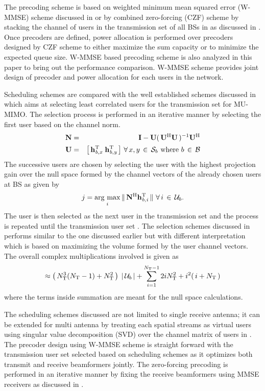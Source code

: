 The precoding scheme is based on weighted minimum mean squared error (W-MMSE) scheme discussed in \cite{wmmse_shi} or by combined zero-forcing (CZF) scheme by stacking the channel of users in the transmission set of all BSs in  as discussed in \cite{spencer2004zero}. Once precoders are defined, power allocation is performed over precoders designed by CZF scheme to either maximize the sum capacity or to minimize the expected queue size. W-MMSE based precoding scheme is also analyzed in this paper to bring out the performance comparison. W-MMSE scheme provides joint design of precoder and power allocation for each users in the network.

Scheduling schemes are compared with the well established schemes discussed in \cite{sus2006zfbf,zhang2007user} which aims at selecting least correlated users for the transmission set for MU-MIMO. The selection process is performed in an iterative manner by selecting the first user based on the channel norm.
\begin{eqnarray}
\mathbf{N} &=& \mathbf{I} - \mathbf{U} ( \, \mathbf{U}^{\mathrm{H}} \mathbf{U} \, )^{-1} \mathbf{U}^{\mathrm{H}} \label{sm-e3} \\
\mathbf{U} &=& \left [ \, \mathbf{h}_{\mathit{b},\mathit{x}}^{\mathrm{T}} \; \mathbf{h}_{\mathit{b},\mathit{y}}^{\mathrm{T}} \, \right ] \, \forall \, x,y \, \in \, \mathcal{S}_b \text{ where } b \, \in \, \mathcal{B} \nonumber
\end{eqnarray}
The successive users are chosen by selecting the user with the highest projection gain over the null space formed by the channel vectors of the already chosen users at BS  as given by
\begin{equation}
j = \operatorname*{\arg\,max}_i \|\, \mathbf{N}^{\mathrm{H}} \mathbf{h}_{\mathit{b},\mathit{i}}^{\mathrm{T}} \,\| \, \, \forall \, i \, \in \, \mathcal{U}_b.
\end{equation}
The user  is then selected as the next user in the transmission set and the process is repeated until the transmission user set . The selection schemes discussed in \cite{jin2010novel,ko2012determinant} performs similar to the one discussed earlier but with different interpretation which is based on maximizing the volume formed by the user channel vectors. The overall complex multiplications involved is given as
\begin{equation}
\approx \left ( \, N^3_{\mathrm{T}} (N_{\mathrm{T}} - 1) + N^2_{\mathrm{T}} \, \right ) \; | \, \mathcal{U}_b \, | + \sum_{i = 1}^{N_{\mathrm{T}} - 1} 2i N^2_{\mathrm{T}} + i^2( \, i + N_{\mathrm{T}} \,)
\label{sm-e4}
\end{equation}
where the terms inside summation are meant for the null space calculations.

The scheduling schemes discussed are not limited to single receive antenna; it can be extended for multi antenna by treating each spatial streams as virtual users using singular value decomposition (SVD) over the channel matrix of users in . The precoder design using W-MMSE scheme is straight forward with the transmission user set selected based on scheduling schemes as it optimizes both transmit and receive beamformers jointly. The zero-forcing precoding is performed in an iterative manner by fixing the receive beamformers using MMSE receivers as discussed in \cite{antti_user_selection}.
